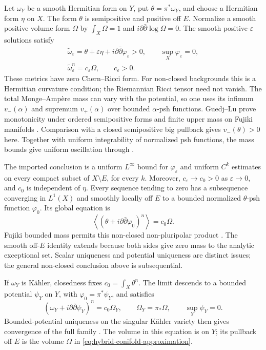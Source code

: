 Let $\omega_Y$ be a smooth Hermitian form on $Y$, put
$\theta=\pi^*\omega_Y$, and choose a Hermitian form $\eta$ on $X$.
The form $\theta$ is semipositive and positive off $E$.
Normalize a smooth positive volume form $\Omega$ by
$\int_X\Omega=1$ and $i\partial\bar\partial\log\Omega=0$.
The smooth positive-$\varepsilon$ solutions satisfy
\[
\begin{gathered}
 \widetilde\omega_\varepsilon
   =\theta+\varepsilon\eta+i\partial\bar\partial\varphi_\varepsilon>0,
 \qquad \sup_X\varphi_\varepsilon=0,\\
 \widetilde\omega_\varepsilon^n=c_\varepsilon\Omega,
 \qquad c_\varepsilon>0.
\end{gathered}
\tag{66.34g}\label{eq:hybrid-conifold-approximation}
\]
These metrics have zero Chern--Ricci form. For non-closed backgrounds
this is a Hermitian curvature condition; the Riemannian Ricci tensor
need not vanish. The total Monge--Amp\`ere mass can vary with the
potential, so one uses its infimum $v_-(\alpha)$ and supremum
$v_+(\alpha)$ over bounded $\alpha$-psh functions. Guedj--Lu prove
monotonicity under ordered semipositive forms and finite upper mass
on Fujiki manifolds
\cite[Proposition~3.2 and Corollary~3.8]{GuedjLu22VolumesPublished}.
Comparison with a closed semipositive big pullback gives
$v_-(\theta)>0$ here. Together with uniform integrability of normalized
psh functions, the mass bounds give uniform oscillation through
\cite[Theorem~A]{GuedjLu21Envelopes3V1}.

The imported conclusion is a uniform $L^\infty$ bound for
$\varphi_\varepsilon$ and uniform $C^k$ estimates on every compact
subset of $X\setminus E$, for every $k$. Moreover,
$c_\varepsilon\to c_0>0$ as $\varepsilon\to0$, and $c_0$ is independent
of $\eta$. Every sequence tending to zero has a subsequence converging
in $L^1(X)$ and smoothly locally off $E$ to a bounded normalized
$\theta$-psh function $\varphi_0$. Its global equation is
\[
 \left\langle
   (\theta+i\partial\bar\partial\varphi_0)^n
 \right\rangle=c_0\Omega.
\tag{66.34h}\label{eq:hybrid-conifold-subsequence}
\]
Fujiki bounded mass permits this non-closed non-pluripolar product
\cite[Theorem~2.2]{BoucksomGuedjLu25VolumesPublished}.
The smooth off-$E$ identity extends because both sides give zero
mass to the analytic exceptional set. Scalar uniqueness and potential
uniqueness are distinct issues; the general non-closed conclusion
above is subsequential.

If $\omega_Y$ is K\"ahler, closedness fixes
$c_0=\int_X\theta^n$. The limit descends to a bounded potential
$\psi_Y$ on $Y$, with $\varphi_0=\pi^*\psi_Y$, and satisfies
\[
 (\omega_Y+i\partial\bar\partial\psi_Y)^n
   =c_0\Omega_Y,\qquad
 \Omega_Y=\pi_*\Omega,\qquad \sup_Y\psi_Y=0.
\tag{66.34i}\label{eq:hybrid-conifold-closed-limit}
\]
Bounded-potential uniqueness on the singular K\"ahler variety then
gives convergence of the full family
\cite[Corollary~1.1 and Proposition~3.3]{GuyettMcGowan26ConifoldV1}.
The volume in this equation is on $Y$; its pullback off $E$ is
the volume $\Omega$ in \eqref{eq:hybrid-conifold-approximation}.

